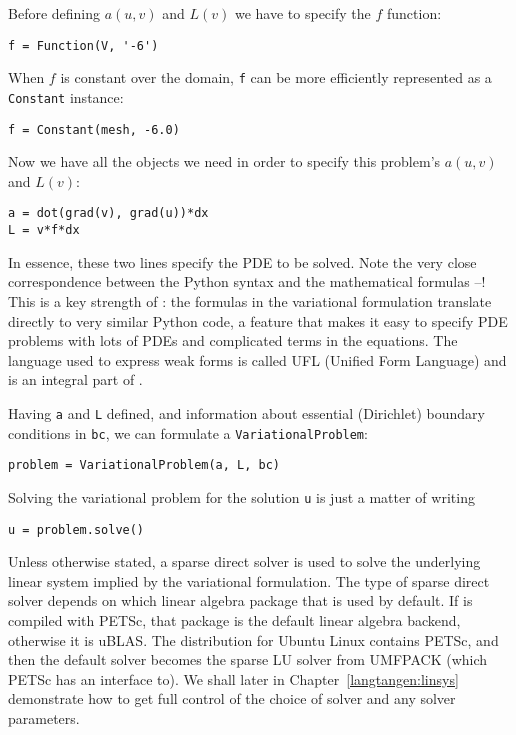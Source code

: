 Before defining $a(u,v)$ and $L(v)$ we have to specify the $f$ function:
\begin{Verbatim}[fontsize=\fontsize{10pt}{10pt},tabsize=8,baselinestretch=1.05,
fontfamily=tt,xleftmargin=7mm]
f = Function(V, '-6')
\end{Verbatim}
\noindent
When $f$ is constant over the domain, {\fontsize{12pt}{12pt}\texttt{f}} can be
more efficiently represented as a {\fontsize{12pt}{12pt}\texttt{Constant}} instance:
\begin{Verbatim}[fontsize=\fontsize{10pt}{10pt},tabsize=8,baselinestretch=1.05,
fontfamily=tt,xleftmargin=7mm]
f = Constant(mesh, -6.0)
\end{Verbatim}
\noindent
Now we have all the objects we need in order to specify this problem's
$a(u,v)$ and $L(v)$:
\begin{Verbatim}[fontsize=\fontsize{10pt}{10pt},tabsize=8,baselinestretch=1.05,
fontfamily=tt,xleftmargin=7mm]
a = dot(grad(v), grad(u))*dx
L = v*f*dx
\end{Verbatim}
\noindent
In essence, these two lines specify the PDE to be solved.
Note the very close correspondence between the Python syntax
and the mathematical formulas --!
This is a key strength of \fenics: the formulas in the variational
formulation translate directly to very similar Python code, a feature
that makes it easy to specify PDE problems with lots of PDEs and
complicated terms in the equations.
The language used to express weak forms is called UFL (Unified Form Language)
and is an integral part of \fenics.

Having {\fontsize{12pt}{12pt}\verb!a!} and {\fontsize{12pt}{12pt}\verb!L!} defined, and information about essential
(Dirichlet) boundary conditions in {\fontsize{12pt}{12pt}\verb!bc!}, we can formulate a 
{\fontsize{12pt}{12pt}\verb!VariationalProblem!}:
\begin{Verbatim}[fontsize=\fontsize{10pt}{10pt},tabsize=8,baselinestretch=1.05,
fontfamily=tt,xleftmargin=7mm]
problem = VariationalProblem(a, L, bc)
\end{Verbatim}
\noindent
Solving the variational problem for the solution {\fontsize{12pt}{12pt}\verb!u!} is just a
matter of writing
\begin{Verbatim}[fontsize=\fontsize{10pt}{10pt},tabsize=8,baselinestretch=1.05,
fontfamily=tt,xleftmargin=7mm]
u = problem.solve()
\end{Verbatim}
\noindent
Unless otherwise stated, a sparse direct solver is used to solve the underlying
linear system implied by the variational formulation. The type
of sparse direct solver depends on which linear algebra package
that is used by default. If \dolfin{} is compiled with PETSc, that package
is the default linear algebra backend, otherwise it is uBLAS.
The \fenics{} distribution for Ubuntu Linux contains PETSc, and then
the default solver becomes the sparse LU solver from UMFPACK (which
PETSc has an interface to). We shall later in Chapter~\ref{langtangen:linsys}
demonstrate how to get
full control of the choice of solver and any solver parameters.

